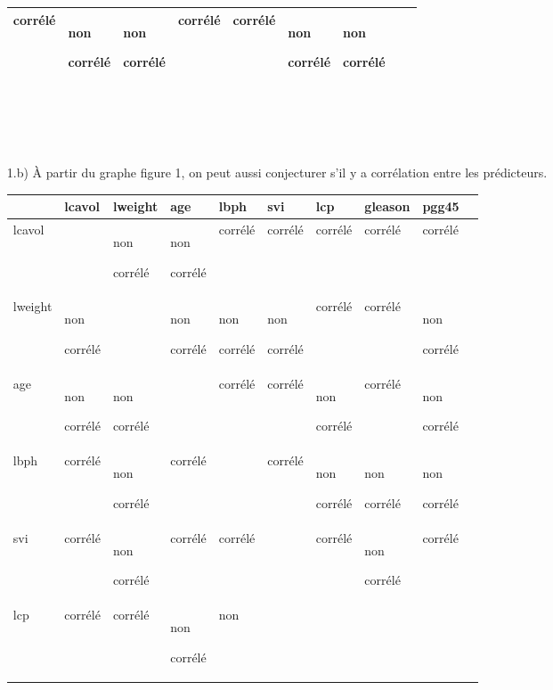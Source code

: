 \documentclass[a4paper, 12pt]{article}
\begin{document}
\begin{enumerate}
\begin{tabular}{|p{0.5cm}|p{1.5cm}|p{1.5cm}|p{1.5cm}|p{1.5cm}|p{1.5cm}|p{1.5cm}|p{1.5cm}|p{1.5cm}|}
   corrélé & non 

    corrélé & non

     corrélé & corrélé & corrélé & non

      corrélé & non

       corrélé \\
  \hline 
\end{tabular}
\\\\\\


\item[1.b)] 
À partir du graphe figure 1, on peut aussi conjecturer s'il y a corrélation entre les prédicteurs.

\begin{tabular}{|p{1.4cm}|p{1.4cm}|p{1.4cm}|p{1.4cm}|p{1.4cm}|p{1.4cm}|p{1.4cm}|p{1.4cm}|p{1.4cm}|p{1.4cm}|}
  \hline
       & lcavol & lweight & age & lbph & svi & lcp & gleason & pgg45 \\
  \hline
  lcavol &  & non 

  corrélé & non 

   corrélé & corrélé & corrélé & corrélé & corrélé & corrélé \\
  \hline 
  lweight & non 

  corrélé & & non

  corrélé & non

  corrélé & non 

  corrélé & corrélé & corrélé & non

   corrélé \\
   \hline
   age & non 

   corrélé & non 

   corrélé &  & corrélé & corrélé & non 

   corrélé & corrélé & non 

   corrélé \\
   \hline
   lbph & corrélé & non 

   corrélé & corrélé & & corrélé & 
   non 

   corrélé & non 

   corrélé &
   non

   corrélé \\
   \hline
   svi & corrélé & non 

   corrélé & corrélé & corrélé & & corrélé & non 

   corrélé & corrélé \\
   \hline
   lcp & corrélé & corrélé & non 

   corrélé & non 


\end{tabular}
\end{enumerate}
\end{document}
